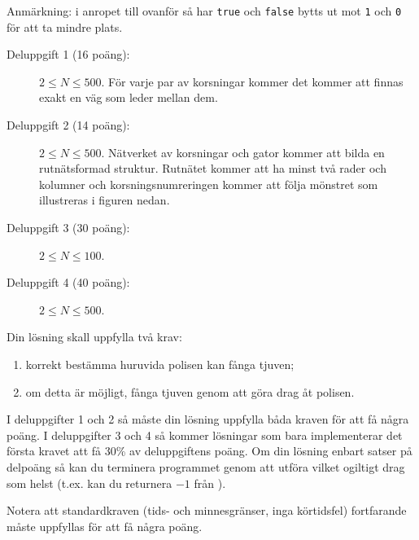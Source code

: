 \documentclass{boi2014-se}
\newcommand{\constant}[1]{{\tt #1}}
\begin{document}
    Anmärkning: i anropet till  ovanför så har \constant{true}
    och \constant{false} bytts ut mot \constant{1} och \constant{0} för att
    ta mindre plats.

    \Scoring

    \begin{description}
        \item[Deluppgift 1 (16 poäng):] $2 \le N \le 500$.
        För varje par av korsningar kommer det kommer att finnas exakt en väg som leder mellan dem.
        \item[Deluppgift 2 (14 poäng):] $2 \le N \le 500$. Nätverket av korsningar
        och gator kommer att bilda en rutnätsformad struktur. Rutnätet kommer att
        ha minst två rader och kolumner och korsningsnumreringen kommer att följa
        mönstret som illustreras i figuren nedan.
        \begin{figure}[h!]
           \centering
        \end{figure}
        \item[Deluppgift 3 (30 poäng):] $2 \le N \le 100$.
        \item[Deluppgift 4 (40 poäng):] $2 \le N \le 500$.
    \end{description}
    
    Din lösning skall uppfylla två krav:
    \begin{enumerate}
        \item korrekt bestämma huruvida polisen kan fånga tjuven;
        \item om detta är möjligt, fånga tjuven genom att göra drag
            åt polisen.
    \end{enumerate}
    
    I deluppgifter 1 och 2 så måste din lösning uppfylla båda kraven för att få några poäng.
    I deluppgifter 3 och 4 så kommer lösningar som bara implementerar det första kravet
    att få 30\% av deluppgiftens poäng. Om din lösning enbart satser på delpoäng så kan du
    terminera programmet genom att utföra vilket ogiltigt drag som helst (t.ex. kan du
    returnera $-1$ från ).

    Notera att standardkraven (tids- och minnesgränser, inga körtidsfel) fortfarande
    måste uppfyllas för att få några poäng.
    \Constraints
    
\end{document}
